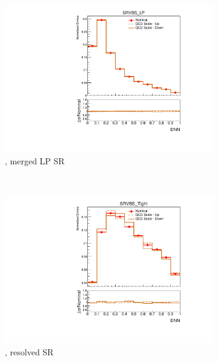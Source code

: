 \begin{figure}[ht]
\begin{subfigure}[b]{0.3\textwidth}
        \includegraphics[width=\textwidth]{figures/1lep/PDFUnc/QCDScale/W_0ptag1pfat0pjet_0ptv_SRVBS_LP_DNN_SysTheoryQCD_W__1up_Norm.pdf}
        \caption{\Wjets, merged LP SR}
    \end{subfigure}
    \\
    \vspace{15mm}
    \begin{subfigure}[b]{0.3\textwidth}
        \includegraphics[width=\textwidth]{figures/1lep/PDFUnc/QCDScale/ttbar_0ptag2pjet_0ptv_SRVBS_Tight_DNN_SysTheoryQCD_ttbar__1up_Norm.pdf}
        \caption{\ttbar, resolved SR}
    \end{subfigure}
    \begin{subfigure}[b]{0.3\textwidth}

\end{subfigure}
\end{figure}

